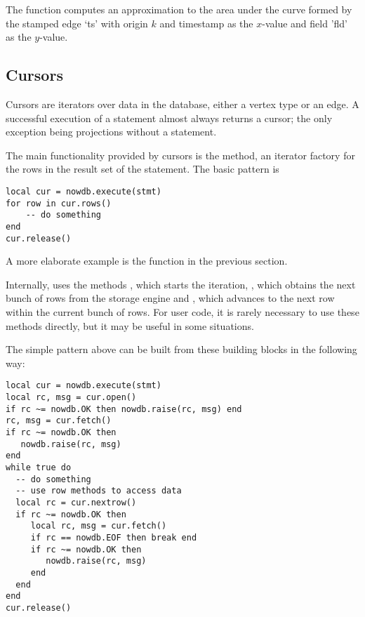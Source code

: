 The function computes an approximation
to the area under the curve
formed by the stamped edge `ts' with origin $k$
and timestamp as the $x$-value and field 'fld'
as the $y$-value.

\subsection{Cursors}
Cursors are iterators over data in the database,
either a vertex type or an edge.
A successful execution of a 
statement almost always returns a cursor;
the only exception being projections without
a  statement.

The main functionality provided by cursors
is the  method, an iterator factory
for the rows in the
result set of the statement.
The basic pattern is

\begin{lua}
\begin{lstlisting}
local cur = nowdb.execute(stmt)
for row in cur.rows()
    -- do something
end
cur.release()
\end{lstlisting}
\end{lua}

A more elaborate example is the 
function in the previous section.

Internally,  uses the methods
, which starts the iteration,
, which obtains the next bunch
of rows from the storage engine and
, which advances to
the next row within the current bunch of rows.
For user code, it is rarely necessary to use
these methods directly, but it may be useful
in some situations.

The simple pattern above can be built from
these building blocks in the following way:

\begin{lua}
\begin{lstlisting}
local cur = nowdb.execute(stmt)
local rc, msg = cur.open()
if rc ~= nowdb.OK then nowdb.raise(rc, msg) end
rc, msg = cur.fetch()
if rc ~= nowdb.OK then
   nowdb.raise(rc, msg)
end
while true do
  -- do something
  -- use row methods to access data
  local rc = cur.nextrow()
  if rc ~= nowdb.OK then
     local rc, msg = cur.fetch()
     if rc == nowdb.EOF then break end
     if rc ~= nowdb.OK then
        nowdb.raise(rc, msg)
     end
  end
end
cur.release()
\end{lstlisting}
\end{lua}

